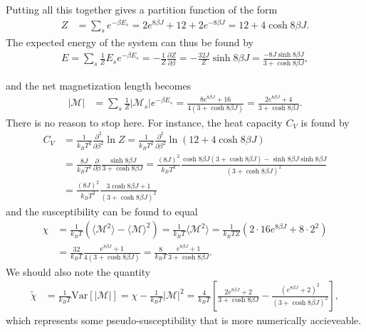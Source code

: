 \documentclass[twoside,utf8]{article}
\newcommand{\EQU}[1] { \begin{equation*} \begin{split} #1 \end{split} \end{equation*} }
\newcommand{\PAR}[2]{ \frac{\partial #1}{\partial #2}}
\begin{document}
Putting all this together gives a partition function of the form
\EQU{
Z &= \sum_s e^{-\beta E_s} 
= 2e^{8\beta J}  + 12  + 2e^{-8\beta J} 
= 12+4\cosh 8\beta J.
}
The expected energy of the system can thus be found by
\EQU{
E = \sum_s \frac{1}{Z}E_s e^{-\beta E_s}
= -\frac{1}{Z} \PAR{Z}{\beta} 
= -\frac{32J}{Z} \sinh 8 \beta J
= \frac{- 8J \sinh 8\beta J}{3+\cosh 8\beta J},
}
 
and the net magnetization length becomes
\EQU{
| \mathcal{M} |
&=\sum_s \frac{1}{Z} |\mathcal{M}_s| e^{-\beta E_s}
=\frac{8e^{8\beta J}+16}{4(3+\cosh 8\beta J)}
=\frac{2e^{8\beta J}+4}{3+\cosh 8\beta J}.
}
There is no reason to stop here. For instance, the heat capacity $C_V$ is found by
\EQU{
C_V &= \frac{1}{k_B T^2} \PAR{^2}{\beta^2}\ln Z
= \frac{1}{k_B T^2} \PAR{^2}{\beta^2}\ln \left(12+4\cosh 8\beta J \right) \\
&= \frac{8J}{k_B T^2} \PAR{}{\beta} \frac{\sinh 8 \beta J}{3+\cosh 8\beta J} 
=\frac{(8J)^2}{k_B T^2} \frac{\cosh  8 \beta J (3+\cosh 8\beta J) - \sinh 8 \beta J \sinh 8 \beta J }{(3+\cosh 8\beta J)^2}\\
&=\frac{(8J)^2}{k_B T^2} \frac{3\cosh  8 \beta J +1 }{(3+\cosh 8\beta J)^2}
}
and the susceptibility can be found to equal
\EQU{
\chi &= \frac{1}{k_B T} \left( \langle \mathcal{M}^2 \rangle - \langle \mathcal{M} \rangle^2   \right)
= \frac{1}{k_B T} \langle \mathcal{M}^2 \rangle 
= \frac{1}{k_B T Z} \left( 
2\cdot 16 e^{8\beta J}
+8 \cdot 2^2
\right)\\
&= \frac{32}{k_B T} \frac{e^{8\beta J}+1}{4(3+\cosh 8\beta J)}
= \frac{8}{k_B T} \frac{e^{8\beta J}+1}{3+\cosh 8\beta J}.
}
We should also note the quantity
\EQU{
\tilde{\chi} &
= \frac{1}{k_B T}\mbox{Var}[|\mathcal{M}|]
=\chi-\frac{1}{k_BT}|\mathcal{M}|^2
=\frac{4}{k_BT}\left[\frac{2e^{8\beta J}+2}{3+\cosh 8\beta J}-\frac{(e^{8\beta J}+2)^2}{(3+\cosh 8\beta J)^2}\right],
}
which represents some pseudo-susceptibility that is more numerically accieveable.
\end{document}
